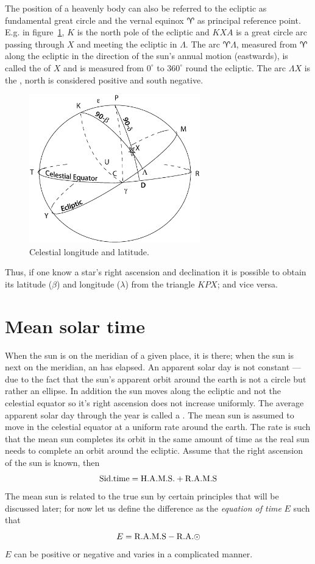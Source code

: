 The position of a heavenly body can also be referred to the ecliptic
as fundamental great circle and the vernal equinox $\aries$ as principal
reference point. E.g. in figure~\ref{fig:ecliptic}, $K$ is the north pole
of the ecliptic and $KXA$ is a great circle arc passing through $X$
and meeting the ecliptic in $\Lambda$. The arc $\aries\Lambda$,
measured from $\aries$ along the ecliptic in the direction of the
sun's annual motion (eastwards), is called the {} of $X$
and is measured from $0^\circ$ to $360^\circ$ round the ecliptic. The
arc $\Lambda X$ is the {}, north is considered positive
and south negative. 
%
\begin{figure}[h]
	\centering
	\includegraphics[width=0.66\textwidth]{ecliptic.eps}
	\caption{Celestial longitude and latitude.}
	\label{fig:ecliptic}
\end{figure}
%
Thus, if one know a star's right ascension and declination it is
possible to obtain its latitude ($\beta$) and longitude ($\lambda$)
from the triangle $KPX$; and vice versa.

\section{Mean solar time}

When the sun is on the meridian of a given place, it is  there; when the sun is next on the meridian, an {} has elapsed. An apparent solar day is not constant --- due
to the fact that the sun's apparent orbit around the earth is not a
circle but rather an ellipse. In addition the sun moves along the
ecliptic and not the celestial equator so it's right ascension does
not increase uniformly. The average apparent solar day through the
year is called a {}. The mean sun is assumed to
move in the celestial equator at a uniform rate around the
earth. The rate is such that the mean sun completes its orbit in the
same amount of time as the real sun needs to complete an orbit around
the ecliptic. Assume that the right ascension of the sun is known,
then 
\[
{\rm Sid. time}={\rm H.A.M.S.}+{\rm R.A.M.S}
\]
The mean sun is related to the true sun by certain principles that
will be discussed later; for now let us define the difference as the
{\it equation of time} $E$ such that
\[
E={\rm R.A.M.S-R.A.\astrosun}
\]
$E$ can be positive or negative and varies in a complicated manner. 

